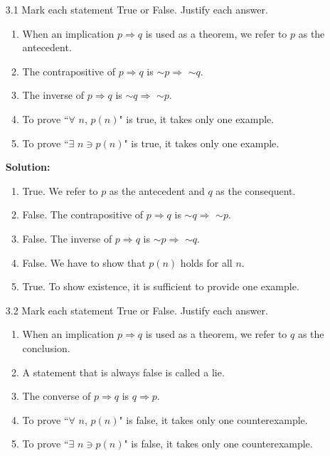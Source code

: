 \begin{enumerate}
   \item[3.1] Mark each statement True or False. Justify each answer.
      \begin{enumerate}
         \item When an implication $p \Rightarrow q$ is used as a theorem, we
               refer to $p$ as the antecedent.
         \item The contrapositive of $p \Rightarrow q$ is
               $\sim$$p \Rightarrow$ $\sim$$q$.
         \item The inverse of $p \Rightarrow q$ is
               $\sim$$q \Rightarrow$ $\sim$$p$.
         \item To prove ``$\forall$ $n$, $p(n)$" is true, it takes only one 
               example.
         \item To prove ``$\exists$ $n \ni p(n)$" is true, it takes only one 
               example.         
      \end{enumerate}

      \textbf{Solution:} 

      \begin{enumerate}
         \item True. We refer to $p$ as the antecedent and $q$ as the 
               consequent.
         \item False. The contrapositive of $p \Rightarrow q$ is
               $\sim$$q \Rightarrow$ $\sim$$p$.
         \item False. The inverse of $p \Rightarrow q$ is
               $\sim$$p \Rightarrow$ $\sim$$q$.
         \item False. We have to show that $p(n)$ holds for all $n$.
         \item True. To show existence, it is sufficient to provide one example.
      \end{enumerate}
   \item[3.2] Mark each statement True or False. Justify each answer.
      \begin{enumerate}
         \item When an implication $p \Rightarrow q$ is used as a theorem, we
               refer to $q$ as the conclusion.
         \item A statement that is always false is called a lie.
         \item The converse of $p \Rightarrow q$ is $q \Rightarrow p$.
         \item To prove ``$\forall$ $n$, $p(n)$" is false, it takes only one
               counterexample.
         \item To prove ``$\exists$ $n \ni p(n)$" is false, it takes only one
               counterexample.
      \end{enumerate}


\end{enumerate}
